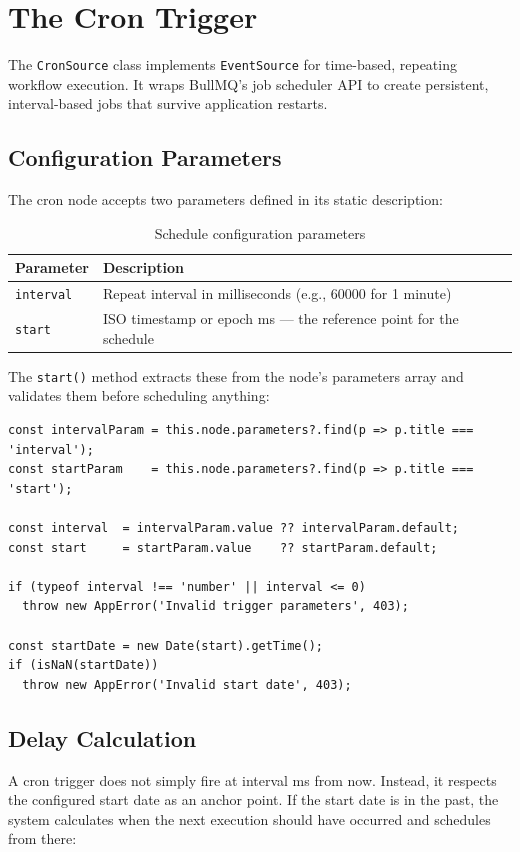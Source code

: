 \section{The Cron Trigger}
The \texttt{CronSource} class implements \texttt{EventSource} for time-based, repeating workflow execution. It wraps BullMQ's job scheduler API to create persistent, interval-based jobs that survive application restarts.

\subsection{Configuration Parameters}
The cron node accepts two parameters defined in its static description:
\begin{table}[htbp]
\centering
\caption{Schedule configuration parameters}
\label{tab:schedule-parameters}
\begin{tabular}{|p{3cm}|p{10cm}|}
\hline
\textbf{Parameter} & \textbf{Description} \\
\hline
\texttt{interval} & Repeat interval in milliseconds (e.g., 60000 for 1 minute) \\
\hline
\texttt{start} & ISO timestamp or epoch ms — the reference point for the schedule \\
\hline
\end{tabular}
\end{table}
The \texttt{start()} method extracts these from the node's parameters array and validates them before scheduling anything:

\begin{lstlisting}
const intervalParam = this.node.parameters?.find(p => p.title === 'interval');
const startParam    = this.node.parameters?.find(p => p.title === 'start');
 
const interval  = intervalParam.value ?? intervalParam.default;
const start     = startParam.value    ?? startParam.default;
 
if (typeof interval !== 'number' || interval <= 0)
  throw new AppError('Invalid trigger parameters', 403);
 
const startDate = new Date(start).getTime();
if (isNaN(startDate))
  throw new AppError('Invalid start date', 403);
\end{lstlisting}

\subsection{Delay Calculation}
A cron trigger does not simply fire at interval ms from now. Instead, it respects the configured start date as an anchor point. If the start date is in the past, the system calculates when the next execution should have occurred and schedules from there:

